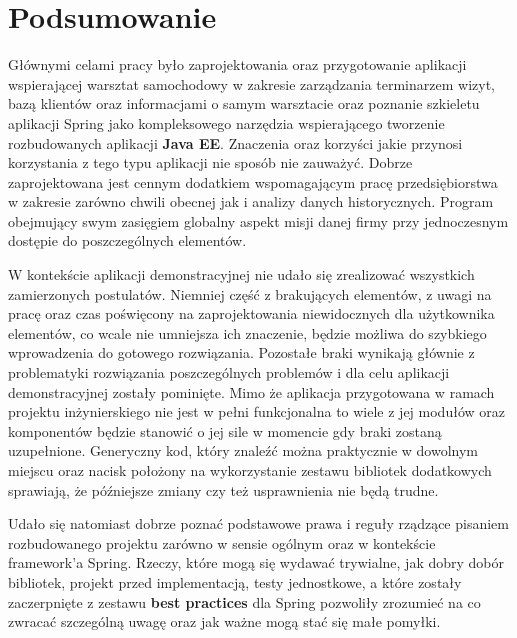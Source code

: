 \chapter{Podsumowanie}
\label{chapter:summary}
	Głównymi celami pracy było zaprojektowania oraz przygotowanie aplikacji wspierającej warsztat samochodowy w zakresie
	zarządzania terminarzem wizyt, bazą klientów oraz informacjami o samym warsztacie oraz poznanie szkieletu aplikacji
	Spring jako kompleksowego narzędzia wspierającego tworzenie rozbudowanych aplikacji \textbf{Java EE}. 
	Znaczenia oraz korzyści jakie przynosi korzystania z tego typu aplikacji nie sposób nie zauważyć. Dobrze zaprojektowana
	jest cennym dodatkiem wspomagającym pracę przedsiębiorstwa w zakresie zarówno chwili obecnej jak i analizy danych historycznych.
	Program obejmujący swym zasięgiem globalny aspekt misji danej firmy przy jednoczesnym dostępie do poszczególnych elementów. 
	
	W kontekście aplikacji demonstracyjnej nie udało się zrealizować wszystkich zamierzonych postulatów. Niemniej część z brakujących
	elementów, z uwagi na pracę oraz czas poświęcony na zaprojektowania niewidocznych dla użytkownika elementów, co wcale nie umniejsza
	ich znaczenie, będzie możliwa do szybkiego wprowadzenia do gotowego rozwiązania. Pozostałe braki wynikają głównie z problematyki
	rozwiązania poszczególnych problemów i dla celu aplikacji demonstracyjnej zostały pominięte.
	Mimo że aplikacja przygotowana w ramach projektu inżynierskiego nie jest w pełni funkcjonalna to wiele z jej modułów oraz komponentów
	będzie stanowić o jej sile w momencie gdy braki zostaną uzupełnione. Generyczny kod, który znaleźć można praktycznie w dowolnym miejscu
	oraz nacisk położony na wykorzystanie zestawu bibliotek dodatkowych sprawiają, że późniejsze zmiany czy też usprawnienia nie będą
	trudne. 
	
	Udało się natomiast dobrze poznać podstawowe prawa i reguły rządzące pisaniem rozbudowanego projektu zarówno w sensie ogólnym
	oraz w kontekście framework'a Spring. Rzeczy, które mogą się wydawać trywialne, jak dobry dobór bibliotek, projekt przed implementacją,
	testy jednostkowe, a które zostały zaczerpnięte z zestawu \textbf{best practices} dla Spring pozwoliły zrozumieć na co zwracać szczególną
	uwagę oraz jak ważne mogą stać się małe pomyłki. 